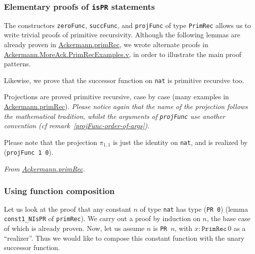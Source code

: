 \subsubsection{Elementary proofs of \texttt{isPR} statements}

The constructors \texttt{zeroFunc}, \texttt{succFunc},  and \texttt{projFunc} of type
\texttt{PrimRec} allows us to write trivial proofs of primitive recursivity. 
Although  the following lemmas are already proven in 
\href{../theories/html/hydras.Ackermann.primRec.html}{Ackermann.primRec},
we wrote alternate proofs in 
\href{../theories/html/hydras.MoreAck.PrimRecExamples.html}%
{Ackermann.MoreAck.PrimRecExamples.v}, in order to illustrate the main proof patterns.




Likewise, we prove that the successor function on \texttt{nat} is primitive recursive too.





Projections are proved primitive recursive, case by case (many examples in 
\href{../theories/html/hydras.Ackermann.primRec.html}{Ackermann.primRec}).
\emph{Please notice again that the name of the projection follows the mathematical tradition, 
whilst the arguments of  \texttt{projFunc} use another convention (\emph{cf} remark~\vref{projFunc-order-of-args}).}






Please note that the projection $\pi_{1,1}$ is just the identity on \texttt{nat}, and is realized by 
(\texttt{projFunc 1 0}).


\vspace{4pt}
\noindent
\emph{From \href{../theories/html/hydras.Ackermann.primRec.html}{Ackermann.primRec}.}



\subsubsection{Using function composition}

Let us look at the proof that any constant $n$ of type \texttt{nat} has type (\texttt{PR 0})
(lemma  \texttt{const1\_NIsPR} of \texttt{primRec}). We carry out a proof by induction on $n$, the base case of which is already proven.
Now, let us assume $n$ is \texttt{PR $n$}, with $x:\texttt{PrimRec}\,0$ as a ``realizer''.
Thus we would like to compose this constant function with the unary successor function.

